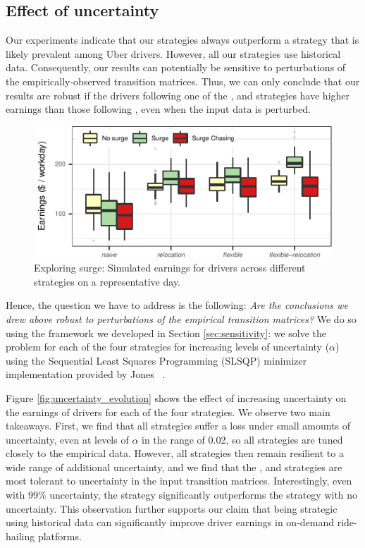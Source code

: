 \subsection{Effect of uncertainty}
\label{sec:effect_of_uncertainty} 
Our experiments indicate that our strategies always outperform a {\naive} strategy that is likely prevalent 
among Uber drivers. However, all our strategies use historical data. Consequently, 
our results can potentially be sensitive to perturbations of the empirically-observed transition matrices. 
Thus, we can only conclude that our results are robust if
the drivers following one of the {\relocation}, {\flexible} and {\relocationflexible} strategies
have higher earnings than those following {\naive}, even when the input data is perturbed.
\begin{figure}
	\includegraphics{figures/simulated_earnings.pdf}
	\setlength{\belowcaptionskip}{-10pt}
	\caption{Exploring surge: Simulated earnings for drivers across different strategies on a representative day.}
	\label{fig:simulated_earnings}
\end{figure}

Hence, the question we have to address is the following: 
\textit{Are the conclusions we drew above robust to perturbations of the empirical transition matrices?} We do so using
the framework we developed in Section \ref{sec:sensitivity}:  
we solve the {\robustproblem} problem for each of the four strategies for increasing levels of uncertainty ($\alpha$) using the Sequential Least Squares Programming (SLSQP) minimizer implementation provided by Jones {\etal}~\cite{scipy}.

Figure \ref{fig:uncertainty_evolution} shows the effect of increasing uncertainty on the earnings of drivers for
    each of the four strategies.  We observe two main takeaways.  First, we find that all strategies
   suffer a loss under small amounts of uncertainty, even at levels of $\alpha$ in the range of 0.02, so all
   strategies are tuned closely to the empirical data.  
However, all strategies then remain resilient to a wide range of additional uncertainty, and we find that
   the {\relocation}, {\flexible} and {\relocationflexible} strategies are most tolerant to uncertainty 
  in the input transition matrices. 
Interestingly, even with 99\% uncertainty, the {\relocationflexible} strategy significantly outperforms 
  the {\naive} strategy with no uncertainty.
This observation further supports our claim that being strategic using historical data can significantly improve driver 
  earnings in on-demand ride-hailing platforms. 

